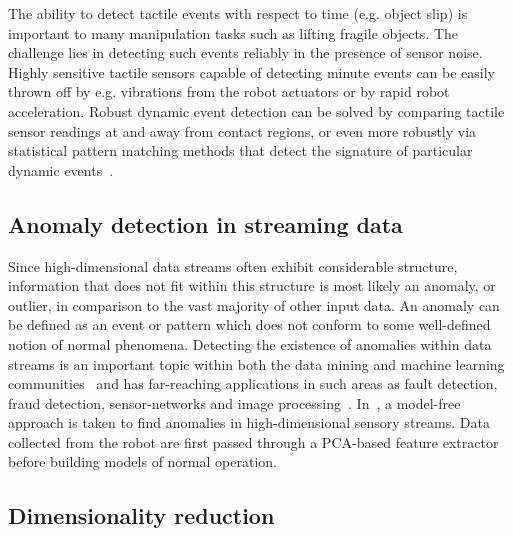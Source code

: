 The ability to detect tactile events with respect to time (e.g. object slip) is important to many manipulation tasks such as lifting fragile objects.
The challenge lies in detecting such events reliably in the presence of sensor noise.
Highly sensitive tactile sensors capable of detecting minute events can be easily thrown off by e.g. vibrations from the robot actuators or by rapid robot acceleration.
Robust dynamic event detection can be solved by comparing tactile sensor readings at and away from contact regions, or even more robustly via statistical pattern matching methods that detect the signature of particular dynamic events~\cite{tremblay1993estimating}.




\subsection{Anomaly detection in streaming data}

Since high-dimensional data streams often exhibit considerable structure, information that does not fit within this structure is most likely an anomaly, or outlier, in comparison to the vast majority of other input data.
An anomaly can be defined as an event or pattern which does not conform to some well-defined notion of normal phenomena.
Detecting the existence of anomalies within data streams is an important topic within both the data mining and machine learning communities~\cite{aggarwal2003framework,kifer2004detecting,dasu2006information,yamanishi2002unifying,song2007statistical} and has far-reaching applications in such areas as fault detection, fraud detection, sensor-networks and image processing~\cite{Chandola2009}.
In~\cite{hornung2014anomaly}, a model-free approach is taken to find anomalies in high-dimensional sensory streams. Data collected from the robot are first passed through a PCA-based feature extractor before building models of normal operation.


\subsection{Dimensionality reduction}

